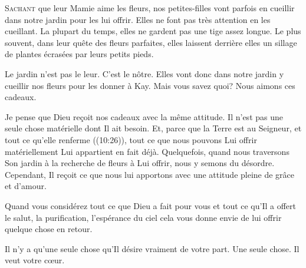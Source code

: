 





\lettrine{S}{achant} que leur Mamie aime les fleurs, nos petites-filles
 vont parfois en cueillir dans notre jardin pour les lui offrir.
 Elles ne font pas très attention en les cueillant.
 La plupart du temps, elles ne gardent pas une tige assez longue.
 Le plus souvent, dans leur quête des fleurs parfaites, elles laissent derrière
 elles un sillage de plantes écrasées par leurs petits pieds.

Le jardin n'est pas le leur. C'est le nôtre. Elles vont donc dans notre jardin
 y cueillir nos fleurs pour les donner à Kay.
 Mais vous savez quoi? Nous aimons ces cadeaux.

Je pense que Dieu re\c{c}oit nos cadeaux avec la même attitude.
 Il n'est pas une seule chose matérielle dont Il ait besoin.
 Et, parce que \Og la Terre est au Seigneur, et tout ce qu'elle renferme \Fg{}
 ((10:26)), tout ce que nous pouvons Lui offrir matériellement
 Lui appartient en fait déjà. Quelquefois, quand nous traversons Son jardin
 à la recherche de fleurs à Lui offrir, nous y semons du désordre.
 Cependant, Il re\c{c}oit ce que nous lui apportons avec une attitude
 pleine de grâce et d'amour.

Quand vous considérez tout ce que Dieu a fait pour vous
 et tout ce qu'Il a offert \ocadr le salut, la purification,
 l'espérance du ciel \fcadr{} cela vous donne envie de lui offrir
 quelque chose en retour.


Il n'y a qu'une seule chose qu'Il désire vraiment de votre part.
 Une seule chose. Il veut votre c\oe{}ur. 

\dvrule


